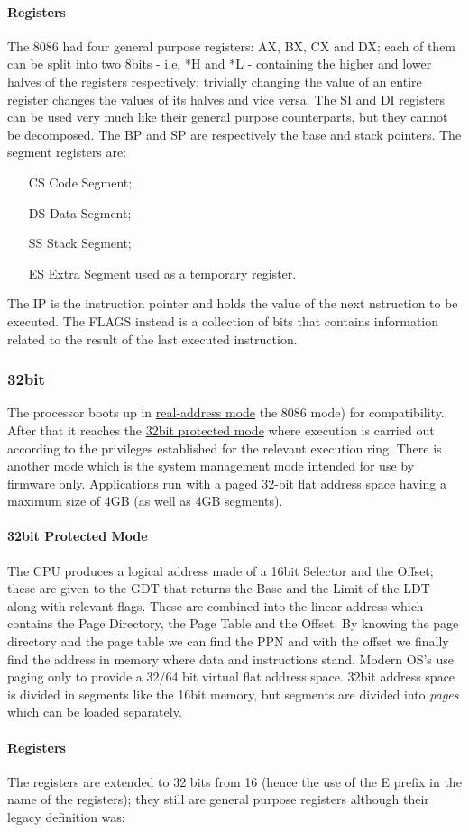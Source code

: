 \paragraph{Registers} The 8086 had four general purpose registers: AX, BX, CX and DX; each of them can be split into two 8bits - i.e. *H and *L - containing the higher and lower halves of the registers respectively; trivially changing the value of an entire register changes the values of its halves and vice versa. The SI and DI registers can be used very much like their general purpose counterparts, but they cannot be decomposed. The BP and SP are respectively the base and stack pointers. The segment registers are:
\begin{itemize}
    \item[CS] Code Segment;
    \item[DS] Data Segment;
    \item[SS] Stack Segment;
    \item[ES] Extra Segment used as a temporary register.
\end{itemize}
The IP is the instruction pointer and holds the value of the next nstruction to be executed. The FLAGS instead is a collection of bits that contains information related to the result of the last executed instruction.  \subsubsection{32bit} 
The processor boots up in \underline{real-address mode} the 8086 mode) for compatibility. After that it reaches the \underline{32bit protected mode} where execution is carried out according to the privileges established for the relevant execution ring. There is another mode which is the system management mode intended for use by firmware only.  Applications run with a paged 32-bit flat address space having a maximum size of 4GB (as well as 4GB segments).  \paragraph{32bit Protected Mode} The CPU produces a logical address made of a 16bit Selector and the Offset; these are given to the GDT that returns the Base and the Limit of the LDT along with relevant flags. These are combined into the linear address which contains the Page Directory, the Page Table and the Offset. By knowing the page directory and the page table we can find the PPN and with the offset we finally find the address in memory where data and instructions stand.  Modern OS's use paging only to provide a 32/64 bit virtual flat address space.  32bit address space is divided in segments like the 16bit memory, but segments are divided into \textit{pages} which can be loaded separately. \paragraph{Registers} The registers are extended to 32 bits from 16 (hence the use of the E prefix in the name of the registers); they still are general purpose registers although their legacy definition was: 
